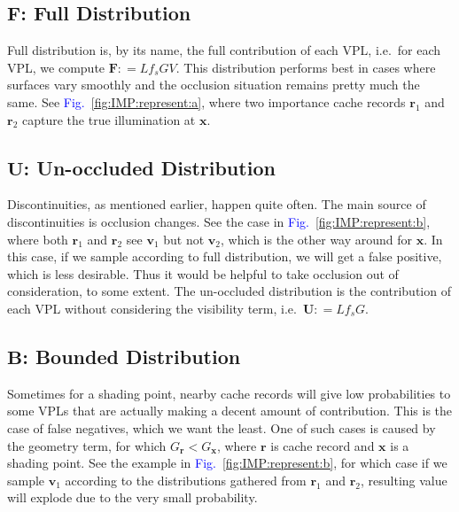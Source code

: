\documentclass[]{book}
\renewcommand{\figurename}{\textcolor{blue}{Fig.\ }}
\begin{document}
\subsection{$\boldsymbol{F}$: Full Distribution}
\label{sec:imp_cache_represent:F}
Full distribution is, by its name, the full contribution of each VPL, i.e.\ for each VPL, we compute $\boldsymbol{F} \mathrel{{:}{=}} L f_s G V$.
This distribution performs best in cases where surfaces vary smoothly and the occlusion situation remains pretty much the same.
See \figurename \ref{fig:IMP:represent:a}, where two importance cache records $\mathbf{r}_1$ and $\mathbf{r}_2$ capture the true illumination at $\mathbf{x}$.

\subsection{$\boldsymbol{U}$: Un-occluded Distribution}
\label{sec:imp_cache_represent:U}
Discontinuities, as mentioned earlier, happen quite often.
The main source of discontinuities is occlusion changes.
See the case in \figurename \ref{fig:IMP:represent:b}, where both $\mathbf{r}_1$ and $\mathbf{r}_2$ see $\mathbf{v}_1$ but not $\mathbf{v}_2$, which is the other way around for $\mathbf{x}$.
In this case, if we sample according to full distribution, we will get a false positive, which is less desirable.
Thus it would be helpful to take occlusion out of consideration, to some extent.
The un-occluded distribution is the contribution of each VPL without considering the visibility term, i.e.\ $\boldsymbol{U} \mathrel{{:}{=}} L f_s G$.

\subsection{$\boldsymbol{B}$: Bounded Distribution}
\label{sec:imp_cache_represent:B}
Sometimes for a shading point, nearby cache records will give low probabilities to some VPLs that are actually making a decent amount of contribution.
This is the case of false negatives, which we want the least.
One of such cases is caused by the geometry term, for which $G_{\mathbf{r}} < G_{\mathbf{x}}$, where $\mathbf{r}$ is cache record and $\mathbf{x}$ is a shading point.
See the example in \figurename \ref{fig:IMP:represent:b}, for which case if we sample $\mathbf{v}_1$ according to the distributions gathered from $\mathbf{r}_1$ and $\mathbf{r}_2$, resulting value will explode due to the very small probability.
\end{document}
